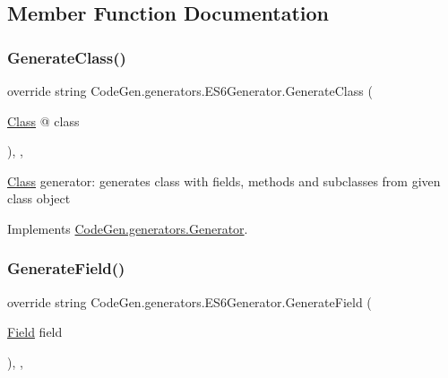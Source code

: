 \subsection{Member Function Documentation}
\mbox{\label{classCodeGen_1_1generators_1_1ES6Generator_a53988e6898a5cf7b926e4c74a5af1703}} 
\subsubsection{\texorpdfstring{Generate\+Class()}{GenerateClass()}}
{\footnotesize\ttfamily override string Code\+Gen.\+generators.\+E\+S6\+Generator.\+Generate\+Class (\begin{DoxyParamCaption}\item[{\mbox{\hyperlink{classCodeGen_1_1generators_1_1Class}{Class}} @}]{class }\end{DoxyParamCaption})\hspace{0.3cm}{\ttfamily [inline]}, {\ttfamily [protected]}, {\ttfamily [virtual]}}



\mbox{\hyperlink{classCodeGen_1_1generators_1_1Class}{Class}} generator\+: generates class with fields, methods and subclasses from given class object  



Implements \mbox{\hyperlink{classCodeGen_1_1generators_1_1Generator_a8847fd8b6d408a0dfc087dcc1dc58340}{Code\+Gen.\+generators.\+Generator}}.

\mbox{\label{classCodeGen_1_1generators_1_1ES6Generator_a35f257a51768270892dfa05dcf2c64c0}} 
\subsubsection{\texorpdfstring{Generate\+Field()}{GenerateField()}}
{\footnotesize\ttfamily override string Code\+Gen.\+generators.\+E\+S6\+Generator.\+Generate\+Field (\begin{DoxyParamCaption}\item[{\mbox{\hyperlink{classCodeGen_1_1generators_1_1Field}{Field}}}]{field }\end{DoxyParamCaption})\hspace{0.3cm}{\ttfamily [inline]}, {\ttfamily [protected]}, {\ttfamily [virtual]}}



